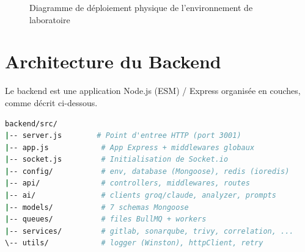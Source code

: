 \documentclass[12pt,a4paper,oneside]{report}
\begin{document}
\begin{figure}[H]\centering
{}
\caption{Diagramme de déploiement physique de l'environnement de laboratoire}\label{fig:deploy}
\end{figure}

\section{Architecture du Backend}
Le backend est une application Node.js (ESM) / Express organisée en couches, comme décrit ci-dessous.

\begin{lstlisting}[style=custom,language=bash,caption={Structure de haut niveau du backend},label={lst:backendstructure}]
backend/src/
|-- server.js        # Point d'entree HTTP (port 3001)
|-- app.js            # App Express + middlewares globaux
|-- socket.js         # Initialisation de Socket.io
|-- config/           # env, database (Mongoose), redis (ioredis)
|-- api/              # controllers, middlewares, routes
|-- ai/               # clients groq/claude, analyzer, prompts
|-- models/           # 7 schemas Mongoose
|-- queues/           # files BullMQ + workers
|-- services/         # gitlab, sonarqube, trivy, correlation, ...
\-- utils/            # logger (Winston), httpClient, retry
\end{lstlisting}
\end{document}
